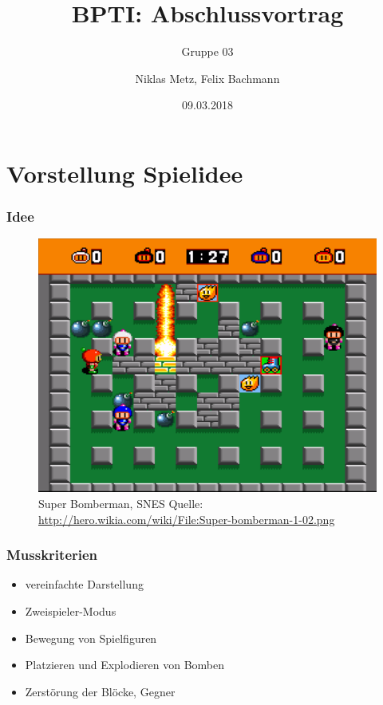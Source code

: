 \documentclass[18pt]{beamer}
\title[BPTI]{BPTI: Abschlussvortrag}
\subtitle{Gruppe 03}
\author{Niklas Metz, Felix Bachmann}
\date{09.03.2018}
\institute{}
\begin{document}

\begin{frame}
\titlepage
\end{frame}

\section{Vorstellung Spielidee}
	
		\begin{frame}
			\frametitle{Idee}
				\begin{figure}[H]
					\centering
					\includegraphics[scale=0.35]{Bilder/bomberman.png}
					\centering
					\caption*{Super Bomberman, SNES \newline Quelle: \url{http://hero.wikia.com/wiki/File:Super-bomberman-1-02.png} }
				\end{figure}
		\end{frame}

		\begin{frame}
			\frametitle{Musskriterien}
				\begin{itemize}
					\item vereinfachte Darstellung
					\item Zweispieler-Modus
					\item Bewegung von Spielfiguren
					\item Platzieren und Explodieren von Bomben
					\item Zerstörung der Blöcke, Gegner
				\end{itemize}
		\end{frame}
	
\end{document}
